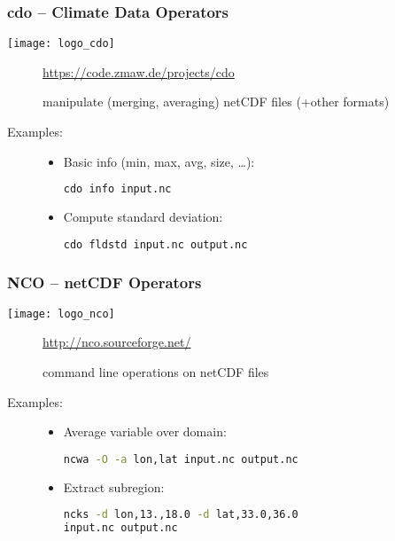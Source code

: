 \begin{frame}[c,fragile]
\frametitle{cdo -- Climate Data Operators}

\texttt{[image: logo\_cdo]}

\begin{description}
\item[\homepage] \url{https://code.zmaw.de/projects/cdo}
\item[\tool] manipulate (merging, averaging) netCDF files (+other formats)
\item[Examples:] 
\begin{itemize}
\item Basic info (min, max, avg, size, \ldots):
\begin{lstlisting}[language=bash,basicstyle=\tiny]
cdo info input.nc
\end{lstlisting}
\item Compute standard deviation:
\begin{lstlisting}[language=bash,basicstyle=\tiny]
cdo fldstd input.nc output.nc
\end{lstlisting}
\end{itemize}
\end{description}



\end{frame}
\begin{frame}[c,fragile]
\frametitle{NCO -- netCDF Operators}

\texttt{[image: logo\_nco]}

\begin{description}
\item[\homepage] \url{http://nco.sourceforge.net/}
\item[\tool] command line operations on netCDF files
\item[Examples:] \begin{itemize}
\item Average variable over domain:
\begin{lstlisting}[language=bash,basicstyle=\tiny]
ncwa -O -a lon,lat input.nc output.nc
\end{lstlisting}
\item Extract subregion:
\begin{lstlisting}[language=bash,basicstyle=\tiny]
ncks -d lon,13.,18.0 -d lat,33.0,36.0 
input.nc output.nc
\end{lstlisting}
\end{itemize}
\end{description}

\end{frame}

